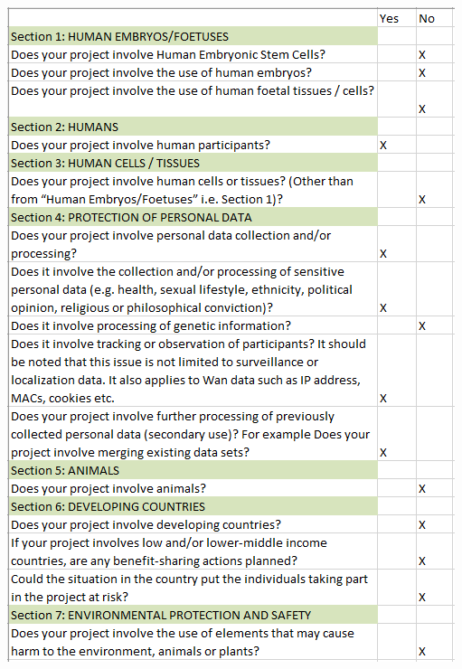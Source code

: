 \documentclass[12pt,twoside]{report}
\begin{document}
\begin{center}
\includegraphics[scale=0.55]{project_figures/LegEth1}
\end{center}
\end{document}
